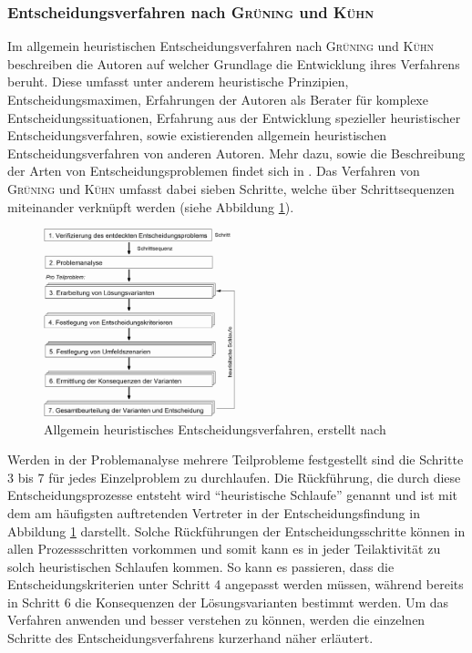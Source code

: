 \subsubsection{Entscheidungsverfahren nach \textsc{Grüning} und \textsc{Kühn}}

Im allgemein heuristischen Entscheidungsverfahren nach \textsc{Grüning} und \textsc{Kühn} beschreiben die Autoren auf welcher Grundlage die Entwicklung ihres Verfahrens beruht. Diese umfasst unter anderem heuristische Prinzipien, Entscheidungsmaximen, Erfahrungen der Autoren als Berater für komplexe Entscheidungssituationen, Erfahrung aus der Entwicklung spezieller heuristischer Entscheidungsverfahren, sowie existierenden allgemein heuristischen Entscheidungsverfahren von anderen Autoren. Mehr dazu, sowie die Beschreibung der Arten von Entscheidungsproblemen findet sich in \cite{Grunig.2013}. Das Verfahren von \textsc{Grüning} und \textsc{Kühn} umfasst dabei sieben Schritte, welche über Schrittsequenzen miteinander verknüpft werden (siehe Abbildung \ref{fig:ahev}).  

\begin{figure}[h!]
	\centering
	\includegraphics[width=0.5\textwidth]{img/heuristik}
	\caption{Allgemein heuristisches Entscheidungsverfahren, erstellt nach \cite{Grunig.2013}}
	\label{fig:ahev}
\end{figure}
\FloatBarrier

Werden in der Problemanalyse mehrere Teilprobleme festgestellt sind die Schritte\,3 bis 7 für jedes Einzelproblem zu durchlaufen. Die Rückführung, die durch diese Entscheidungsprozesse entsteht wird "`heuristische Schlaufe"' genannt und ist mit dem am häufigsten auftretenden Vertreter in der Entscheidungsfindung in Abbildung \ref{fig:ahev} darstellt. Solche Rückführungen der Entscheidungsschritte können in allen Prozessschritten vorkommen und somit kann es in jeder Teilaktivität zu solch heuristischen Schlaufen kommen. So kann es passieren, dass die Entscheidungskriterien unter Schritt 4 angepasst werden müssen, während bereits in Schritt 6 die Konsequenzen der Lösungsvarianten bestimmt werden. \cite{Grunig.2013} Um das Verfahren anwenden und besser verstehen zu können, werden die einzelnen Schritte des Entscheidungsverfahrens kurzerhand näher erläutert. 
\vspace*{-2.5mm}
